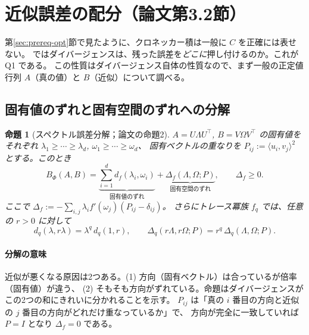 \documentclass[a4paper,11pt]{ltjsarticle}
\theoremstyle{definition}
\theoremstyle{plain}
\newtheorem{proposition}[definition]{命題}
\newcommand{\ip}[2]{\langle #1,#2\rangle}
\newcommand{\T}{^{\top}}
\begin{document}
\section{近似誤差の配分（論文第3.2節）}\label{sec:allocation}

第\ref{sec:prereq-opt}節で見たように、クロネッカー積は一般に $C$ を正確には表せない。
ではダイバージェンスは、残った誤差を\emph{どこに}押し付けるのか。これが Q1 である。
この性質はダイバージェンス自体の性質なので、まず一般の正定値行列 $A$（真の値）と $B$（近似）について調べる。

\subsection{固有値のずれと固有空間のずれへの分解}

\begin{proposition}[スペクトル誤差分解；論文の命題2]\label{prop:decomp}
$A = U\Lambda U\T$, $B = V\Omega V\T$ の固有値をそれぞれ $\lambda_1\ge\cdots\ge\lambda_d$, $\omega_1\ge\cdots\ge\omega_d$、
固有ベクトルの重なりを $P_{ij} := \ip{u_i}{v_j}^2$ とする。このとき
\begin{equation}
  B_\Phi(A,B) = \underbrace{\sum_{i=1}^d d_f(\lambda_i,\omega_i)}_{\text{固有値のずれ}}
  + \underbrace{\Delta_f(\Lambda,\Omega;P)}_{\text{固有空間のずれ}},\qquad \Delta_f\ge0 .
\end{equation}
ここで $\Delta_f := -\sum_{i,j}\lambda_i f'(\omega_j)(P_{ij} - \delta_{ij})$。
さらにトレース冪族 $f_q$ では、任意の $r>0$ に対して
\begin{equation}\label{eq:scaling}
  d_q(\lambda, r\lambda) = \lambda^q\, d_q(1, r),\qquad \Delta_q(r\Lambda, r\Omega; P) = r^q\,\Delta_q(\Lambda,\Omega;P).
\end{equation}
\end{proposition}

\paragraph{分解の意味}
近似が悪くなる原因は2つある。(1) 方向（固有ベクトル）は合っているが倍率（固有値）が違う、
(2) そもそも方向がずれている。命題はダイバージェンスがこの2つの和にきれいに分かれることを示す。
$P_{ij}$ は「真の $i$ 番目の方向と近似の $j$ 番目の方向がどれだけ重なっているか」で、
方向が完全に一致していれば $P = I$ となり $\Delta_f = 0$ である。
\end{document}
